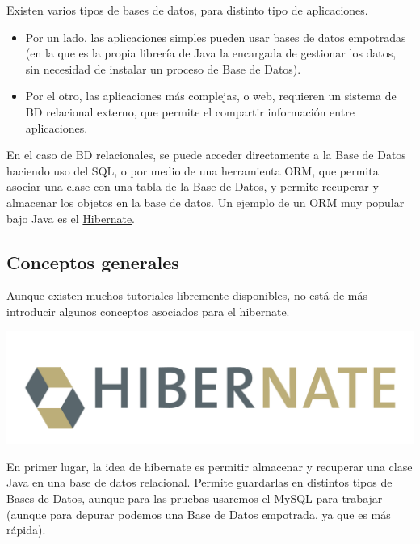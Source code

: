 \documentclass[11pt]{article}
\begin{document}
Existen varios tipos de bases de datos, para distinto tipo de aplicaciones. 




\begin{itemize}
\item Por un lado, las aplicaciones simples pueden usar bases de datos empotradas (en la que es la
  propia librería de Java la encargada de gestionar los datos, sin necesidad de instalar un proceso
  de Base de Datos).
\item Por el otro, las aplicaciones más complejas, o web, requieren un sistema de BD relacional externo, que
  permite el compartir información entre aplicaciones.
\end{itemize}


En el caso de BD relacionales, se puede acceder directamente a la Base de Datos haciendo uso del
SQL, o por medio de una herramienta ORM, que permita asociar una clase con una tabla de la Base de
Datos, y permite recuperar y almacenar los objetos en la base de datos. Un ejemplo de un ORM muy
popular bajo Java es el \href{http://hibernate.org}{Hibernate}.
\subsection{Conceptos generales}
\label{sec-6-1}




Aunque existen muchos tutoriales libremente disponibles, no está de más introducir algunos conceptos
asociados para el hibernate.


\begin{center}
\includegraphics[width=.6\textwidth]{hibernate.png}
\end{center}




En primer lugar, la idea de hibernate es permitir almacenar y recuperar una clase Java en una base de
datos relacional. Permite guardarlas en distintos tipos de Bases de Datos, aunque para las pruebas
usaremos el MySQL para trabajar (aunque para depurar podemos una Base de Datos empotrada, ya que
es más rápida).
\end{document}
